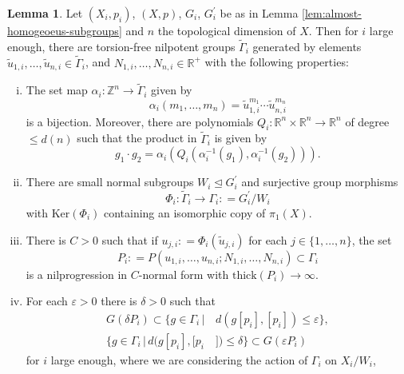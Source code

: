 \documentclass[12pt]{amsart}
\theoremstyle{definition}
\def\fnum{equation}
\newtheorem{lemma}[\fnum]{Lemma}
\numberwithin{equation}{section}
\newcommand{\Ker}{{\text{Ker}}}
\newcommand{\thi}{\text{thick}}
\begin{document}
\begin{lemma}\label{lem:malcev-construction}
Let $(X_i, p_i)$, $(X,p)$, $G_i$, $G_i^{\prime}$ be as in Lemma \ref{lem:almost-homogeoeus-subgroups} and $n$ the topological dimension of $X$. Then for $i$ large enough, there are torsion-free nilpotent groups $\tilde{\Gamma}_i$ generated by elements $\tilde{u}_{1,i}, \ldots , \tilde{u}_{n,i} \in \tilde{\Gamma}_i$, and $N_{1,i}, \ldots , N_{n,i} \in \mathbb{R}^+$ with the following properties:
\begin{enumerate}[i.]
        \item The set map $ \alpha _i  : \mathbb{Z}^n \to \tilde{\Gamma } _i$ given by 
        \[  \alpha_i (m_1 , \ldots , m_n) = \tilde{u}_{1,i}^{m_1}\cdots \tilde {u}_{n,i}^{m_n}       \]
        is a bijection.  Moreover, there are polynomials $Q_i : \mathbb {R}^n \times \mathbb{R}^n\to \mathbb{R}^n$ of degree $\leq d(n)$ such that the product in $\tilde{\Gamma}_i$ is given by 
        \[g_1 \cdot g_2 = \alpha _i ( Q_i ( \alpha _i ^{-1} (g_1) , \alpha _i ^{-1} (g_2) )  ).  \]\label{conclusion:malcev-1}
        \item  There are small normal subgroups $W_i \trianglelefteq G_i^{\prime }$ and surjective group morphisms 
        \[\Phi _i : \tilde {\Gamma }_ i \to \Gamma_i : = G_i^{\prime } / W_i\]
        with $\Ker (\Phi_i)$ containing an isomorphic copy of $\pi_1(X)$.  \label{conclusion:malcev-2}
        \item There is $C > 0 $ such that if $u_{j,i} : = \Phi _i (\tilde{u}_{j,i}) $ for each $j \in \{ 1, \ldots , n\}$, the set
        \[   P_i : = P (  u_{1,i}, \ldots , u_{n,i} ; N_{1,i}, \ldots , N_{n,i} )  \subset \Gamma_i       \]
        is a nilprogression in $C$-normal form with $\thi (P_i ) \to \infty $.  \label{conclusion:malcev-3}
        \item  \label{conclusion:malcev-4} For each $\varepsilon > 0 $ there is $\delta > 0 $ such that 
        \begin{align*}
            G(\delta P_i )     \subset \{ g \in \Gamma_i \, \vert  \,  &d(g[p_i], [p_i] ) \leq \varepsilon \}  , \\
              \{ g \in \Gamma_i \, \vert  \, d(g [p_i ], [p_i&] ) \leq \delta \}  \subset     G( \varepsilon  P_i   ) 
        \end{align*}
        for $i$ large enough, where we are considering the action of $\Gamma _ i$ on $X_i / W_i $,  
\end{enumerate}
\end{lemma}
\end{document}
